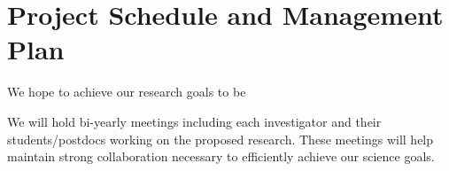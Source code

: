 \section{Project Schedule and Management Plan}

We hope to achieve our research goals to be 

We will  hold bi-yearly meetings including each investigator and their students/postdocs working on the proposed research. These meetings will help maintain strong collaboration necessary to efficiently achieve our science goals.
